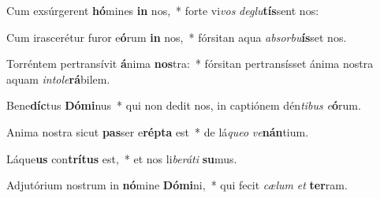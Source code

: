 \item Cum exsúrgerent \textbf{hó}mines \textbf{in} nos,~* forte vi\textit{vos} \textit{de}\textit{glu}\textbf{tís}sent nos:
\item Cum irascerétur furor e\textbf{ó}rum \textbf{in} nos,~* fórsitan aqua \textit{ab}\textit{sor}\textit{bu}\textbf{ís}set nos.
\item Torréntem pertransívit \textbf{á}nima \textbf{nos}tra:~* fórsitan pertransísset ánima nostra aquam \textit{in}\textit{to}\textit{le}\textbf{rá}bilem.
\item Bene\textbf{díc}tus \textbf{Dó}\textbf{mi}nus~* qui non dedit nos, in captiónem dén\textit{ti}\textit{bus} \textit{e}\textbf{ó}rum.
\item Anima nostra sicut \textbf{pas}ser e\textbf{rép}\textbf{ta} est~* de lá\textit{que}\textit{o} \textit{ve}\textbf{nán}tium.
\item Láque\textbf{us} con\textbf{trí}\textbf{tus} est,~* et nos li\textit{be}\textit{rá}\textit{ti} \textbf{su}mus.
\item Adjutórium nostrum in \textbf{nó}mine \textbf{Dó}\textbf{mi}ni,~* qui fecit \textit{cæ}\textit{lum} \textit{et} \textbf{ter}ram.
